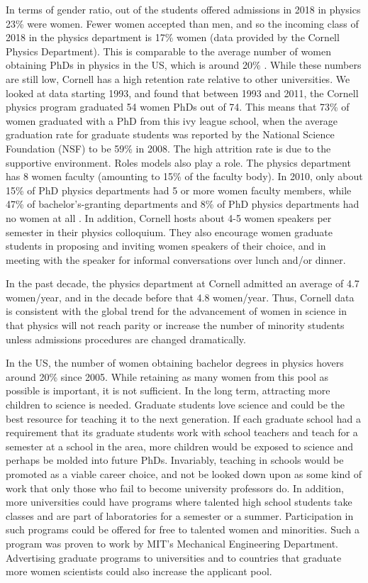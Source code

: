 \documentclass[utf8]{frontiersSCNS} %
\begin{document}
In terms of gender ratio, out of the students offered admissions in 2018 in physics 23\% were women. Fewer women accepted than men, and so the incoming class of 2018 in the physics department is 17\% women (data provided by the Cornell Physics Department). This is comparable to the average number of women obtaining PhDs in physics in the US, which is around 20\% \citep{apsData}. While these numbers are still low, Cornell has a high retention rate relative to other universities. We looked at data starting 1993, and found that between 1993 and 2011, the Cornell physics program graduated 54 women PhDs out of 74. This means that 73\% of women graduated with a PhD from this ivy league school, when the average graduation rate for graduate students was reported by the National Science Foundation (NSF) to be 59\% in 2008. The high attrition rate is due to the supportive environment. Roles models also play a role. The physics department has 8 women faculty (amounting to 15\% of the faculty body). In 2010, only about 15\% of PhD physics departments had 5 or more women faculty members, while 47\% of  bachelor’s-granting departments and 8\% of PhD physics departments had no women at all \citep{ivie2013women}. In addition, Cornell hosts about 4-5 women speakers per semester in their physics colloquium. They also encourage women graduate students in proposing and inviting women speakers of their choice, and in meeting with the speaker for informal conversations over lunch and/or dinner. 

In the past decade, the physics department at Cornell admitted an average of 4.7 women/year, and in the decade before that 4.8 women/year. Thus, Cornell data is consistent with the global trend for the advancement of women in science in that physics will not reach parity or increase the number of minority students unless admissions procedures are changed dramatically. 

In the US, the number of women obtaining bachelor degrees in physics hovers around 20\% since 2005. While retaining as many women from this pool as possible is important, it is not sufficient.  In the long term, attracting more children to science is needed. Graduate students love science and could be the best resource for teaching it to the next generation. If each graduate school had a requirement that its graduate students work with school teachers and teach for a semester at a school in the area, more children would be exposed to science and perhaps be molded into future PhDs. Invariably, teaching in schools would be promoted as a viable career choice, and not be looked down upon as some kind of work that only those who fail to become university professors do. In addition, more universities could have programs where talented high school students take classes and are part of laboratories for a semester or a summer. Participation in such programs could be offered for free to talented women and minorities. Such a program was proven to work by MIT's Mechanical Engineering Department. Advertising graduate programs to universities and to countries that graduate more women scientists could also increase the applicant pool.
\end{document}
